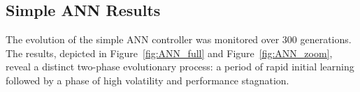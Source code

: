 \documentclass[final,5p,times,twocolumn,authoryear]{elsarticle}
\begin{document}


    
    



\subsection{Simple ANN Results}

The evolution of the simple ANN controller was monitored over 300 generations. The results, depicted in Figure~\ref{fig:ANN_full} and Figure~\ref{fig:ANN_zoom}, reveal a distinct two-phase evolutionary process: a period of rapid initial learning followed by a phase of high volatility and performance stagnation.
\end{document}

